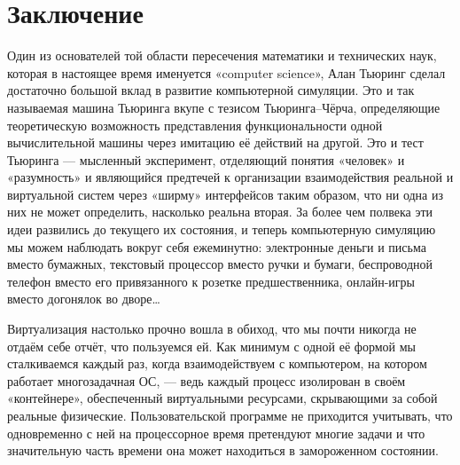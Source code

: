 \chapter{Заключение}\label{afterword}



Один из основателей той области пересечения математики и технических наук, которая в настоящее время именуется «computer science», Алан Тьюринг сделал достаточно большой вклад в развитие компьютерной симуляции. Это и так называемая машина Тьюринга вкупе с тезисом Тьюринга--Чёрча, определяющие теоретическую возможность представления функциональности одной вычислительной машины через имитацию её действий на другой. Это и тест Тьюринга — мысленный эксперимент, отделяющий понятия «человек» и «разумность» и являющийся предтечей к  организации взаимодействия реальной и виртуальной систем через «ширму» интерфейсов таким образом, что ни одна из них не может определить, насколько реальна вторая. За более чем полвека эти идеи развились до текущего их состояния, и теперь компьютерную симуляцию мы можем наблюдать вокруг себя ежеминутно: электронные деньги и письма вместо бумажных, текстовый процессор вместо ручки и бумаги, беспроводной телефон вместо его привязанного к розетке предшественника, онлайн-игры вместо догонялок во дворе\dots

Виртуализация настолько прочно вошла в обиход, что мы почти никогда не отдаём себе отчёт, что пользуемся ей. Как минимум с одной её формой мы сталкиваемся каждый раз, когда взаимодействуем с компьютером, на котором работает многозадачная ОС, — ведь каждый процесс изолирован в своём «контейнере», обеспеченный виртуальными ресурсами, скрывающими за собой реальные физические. Пользовательской программе не приходится учитывать, что одновременно с ней на процессорное время претендуют многие задачи и что значительную часть времени она может находиться в замороженном состоянии.

